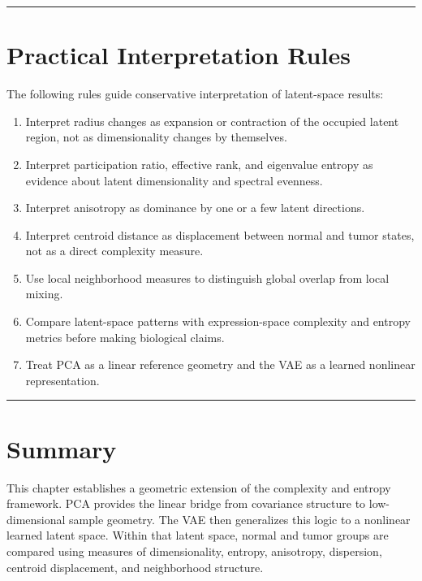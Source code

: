 \documentclass[
  letterpaper,
  DIV=11,
  numbers=noendperiod,
  openany,
  oneside]{scrreprt}
\providecommand{\tightlist}{%
  \setlength{\itemsep}{0pt}\setlength{\parskip}{0pt}}
\begin{document}
\begin{center}\rule{0.5\linewidth}{0.5pt}\end{center}

\section{Practical Interpretation
Rules}\label{practical-interpretation-rules-1}

The following rules guide conservative interpretation of latent-space
results:

\begin{enumerate}
\def\labelenumi{\arabic{enumi}.}
\tightlist
\item
  Interpret radius changes as expansion or contraction of the occupied
  latent region, not as dimensionality changes by themselves.
\item
  Interpret participation ratio, effective rank, and eigenvalue entropy
  as evidence about latent dimensionality and spectral evenness.
\item
  Interpret anisotropy as dominance by one or a few latent directions.
\item
  Interpret centroid distance as displacement between normal and tumor
  states, not as a direct complexity measure.
\item
  Use local neighborhood measures to distinguish global overlap from
  local mixing.
\item
  Compare latent-space patterns with expression-space complexity and
  entropy metrics before making biological claims.
\item
  Treat PCA as a linear reference geometry and the VAE as a learned
  nonlinear representation.
\end{enumerate}

\begin{center}\rule{0.5\linewidth}{0.5pt}\end{center}

\section{Summary}\label{summary-1}

This chapter establishes a geometric extension of the complexity and
entropy framework. PCA provides the linear bridge from covariance
structure to low-dimensional sample geometry. The VAE then generalizes
this logic to a nonlinear learned latent space. Within that latent
space, normal and tumor groups are compared using measures of
dimensionality, entropy, anisotropy, dispersion, centroid displacement,
and neighborhood structure.
\end{document}
